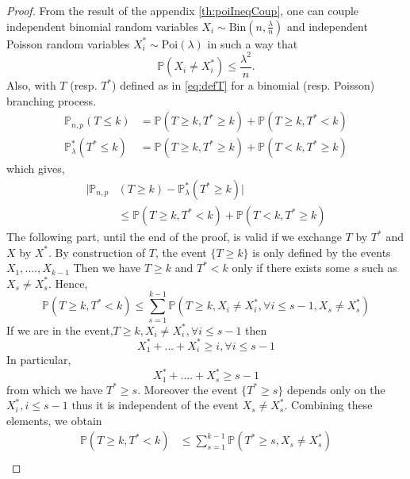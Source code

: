 \begin{proof}
	From the result of the appendix \ref{th:poiIneqCoup}, one can couple independent binomial random variables $X_i \sim \text{Bin}(n, \frac{\lambda}{n})$
	and independent Poisson random variables $X_i^* \sim \text{Poi}(\lambda)$ in such a way that
	\begin{equation}
		\mathbb{P}(X_i \neq X_i^*) \leq \frac{\lambda^2}{n}.
	\end{equation}
	Also, with $T$ (resp. $T^*$) defined as in \eqref{eq:defT} for a binomial (resp. Poisson) branching process.
	\begin{align}
		\mathbb{P}_{n,p}(T\leq k) &= \mathbb{P}(T\geq k, T^* \geq k) +\mathbb{P}(T\geq k, T^* < k)\\
		\mathbb{P}_{\lambda}^*(T^*\leq k) &= \mathbb{P}(T\geq k, T^* \geq k) +\mathbb{P}(T< k, T^* \geq k)
	\end{align}
	which gives,
	\begin{align}
		|\mathbb{P}_{n, p}&(T \geq k) -\mathbb{P}_{\lambda}^*(T^* \geq k)|\\
				  &\leq  \mathbb{P}(T\geq k, T^* < k) +\mathbb{P}(T< k, T^* \geq k)
	\end{align}
	The following part, until the end of the proof, is valid if we exchange $T$ by $T^*$ and $X$ by $X^*$.
	\newline
	By construction of $T$, the event $\{T\geq k\}$ is only defined by the events $X_1, ...., X_{k-1}$
	Then we have $T\geq k$ and $T^*<k$ only if there exists some $s$ such as $X_s \neq X_s^*$.
	Hence, 
	\begin{equation}
		\mathbb{P}(T\geq k, T^*<k) \leq \sum_{s=1}^{k-1}\mathbb{P}(T \geq k, X_i \neq X_i^*, \forall i \leq s-1, X_s \neq X_s^*)
	\end{equation}
	If we are in the event,$T \geq k, X_i \neq X_i^*, \forall i \leq s-1$ then
	\begin{equation}
		X_1^*+...+X_i^* \geq i, \forall i \leq s-1
	\end{equation}
	In particular,
	\begin{equation}
		X_1^*+....+X_s^*  \geq s-1
	\end{equation}
	from which we have $T^* \geq s$.
	Moreover the event $\{T^* \geq s\}$ depends only on the $X_i^*, i\leq s-1$ thus it is independent of the event $X_s \neq X_s^*$.
	Combining these elements, we obtain
	\begin{align}
		\mathbb{P}(T\geq k, T^* < k) &\leq \sum_{s=1}^{k-1} \mathbb{P}(T^* \geq s, X_s \neq X_s^*) 	\\

\end{align}
\end{proof}
